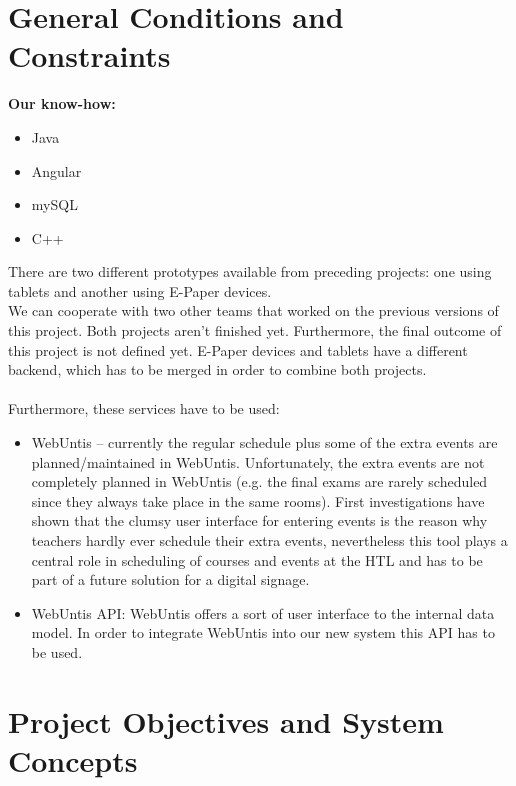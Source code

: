 \documentclass{article}
\newenvironment{explanation}{%
   \color{black}
}{}
\begin{document}
\section{General Conditions and Constraints}

\begin{explanation}
\textbf{Our know-how:}
\begin{itemize}
\item Java 
\item Angular
\item mySQL 
\item C++
\\
\end{itemize}
There are two different prototypes available from preceding projects: one using tablets and another using E-Paper devices. 
\\We can cooperate with two other teams that worked on the previous versions of this project. Both projects aren’t finished yet. Furthermore, the final outcome of this project is not defined yet. E-Paper devices and tablets have a different backend, which has to be merged in order to combine both projects. \\
\\
Furthermore, these services have to be used:
\begin{itemize}
\item WebUntis – currently the regular schedule plus some of the extra events are planned/maintained in WebUntis. Unfortunately, the extra events are not completely planned in WebUntis (e.g. the final exams are rarely scheduled since they always take place in the same rooms). First investigations have shown that the clumsy user interface for entering events is the reason why teachers hardly ever schedule their extra events, nevertheless this tool plays a central role in scheduling of courses and events at the HTL and has to be part of a future solution for a digital signage. 
\item WebUntis API: WebUntis offers a sort of user interface to the internal data model. In order to integrate WebUntis into our new system this API has to be used.
\\
\end{itemize}
\end{explanation}

\pagebreak

\section{Project Objectives and System Concepts}
\end{document}
